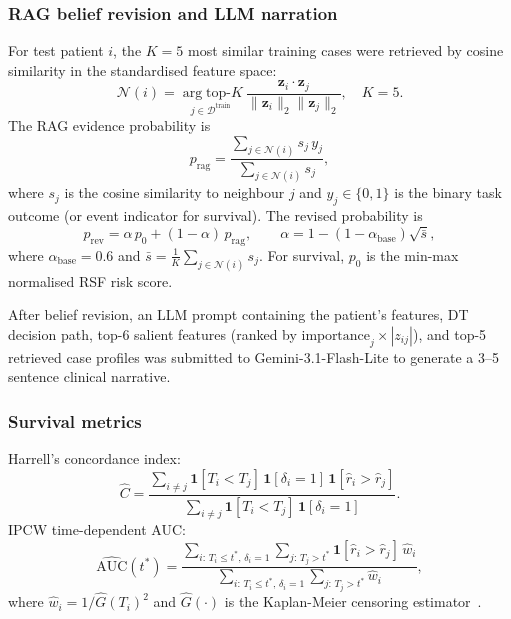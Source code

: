 \documentclass[pdflatex,sn-nature]{sn-jnl}
\begin{document}
\subsubsection{RAG belief revision and LLM narration}\label{sec:rag_methods}

For test patient $i$, the $K=5$ most similar training cases were
retrieved by cosine similarity in the standardised feature space:
\begin{equation}
\mathcal{N}(i) = \underset{j \in \mathcal{D}^{\text{train}}}
  {\arg\text{top-}K}\
  \frac{\mathbf{z}_i \cdot \mathbf{z}_j}
       {\|\mathbf{z}_i\|_2 \|\mathbf{z}_j\|_2}, \quad K = 5.
\label{eq:rag}
\end{equation}
The RAG evidence probability is
\begin{equation}
p_{\text{rag}} =
  \frac{\sum_{j \in \mathcal{N}(i)} s_j\, y_j}
       {\sum_{j \in \mathcal{N}(i)} s_j},
\label{eq:prag}
\end{equation}
where $s_j$ is the cosine similarity to neighbour $j$ and
$y_j \in \{0,1\}$ is the binary task outcome (or event indicator
for survival).
The revised probability is
\begin{equation}
p_{\text{rev}} = \alpha\, p_0 + (1-\alpha)\, p_{\text{rag}},
\qquad
\alpha = 1 - (1-\alpha_{\text{base}})\sqrt{\bar{s}},
\label{eq:prev}
\end{equation}
where $\alpha_\text{base}=0.6$ and
$\bar{s} = \frac{1}{K}\sum_{j \in \mathcal{N}(i)} s_j$.
For survival, $p_0$ is the min-max normalised RSF risk score.

After belief revision, an LLM prompt containing the patient's features,
DT decision path, top-6 salient features (ranked by
$\text{importance}_j \times |z_{ij}|$), and top-5 retrieved case
profiles was submitted to Gemini-3.1-Flash-Lite to generate a 3--5
sentence clinical narrative.

\subsubsection{Survival metrics}\label{sec:surv_methods}

Harrell's concordance index:
\begin{equation}
\hat{C} =
\frac{
  \sum_{i \neq j}
  \mathbf{1}[T_i < T_j]\,
  \mathbf{1}[\delta_i = 1]\,
  \mathbf{1}[\hat{r}_i > \hat{r}_j]
}{
  \sum_{i \neq j}
  \mathbf{1}[T_i < T_j]\,
  \mathbf{1}[\delta_i = 1]
}.
\label{eq:cindex}
\end{equation}
IPCW time-dependent AUC:
\begin{equation}
\widehat{\text{AUC}}(t^*) =
\frac{
  \sum_{i:\,T_i \leq t^*,\,\delta_i=1}
  \sum_{j:\,T_j > t^*}
  \mathbf{1}[\hat{r}_i > \hat{r}_j]\,\hat{w}_i
}{
  \sum_{i:\,T_i \leq t^*,\,\delta_i=1}
  \sum_{j:\,T_j > t^*}
  \hat{w}_i
},
\label{eq:itauc}
\end{equation}
where $\hat{w}_i = 1/\hat{G}(T_i)^2$ and $\hat{G}(\cdot)$ is the
Kaplan-Meier censoring estimator~\cite{[CITE:Uno2011]}.
\end{document}
